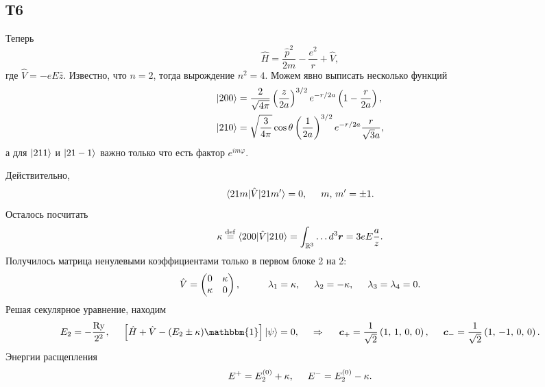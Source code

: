 \subsection*{Т6}


Теперь
\begin{equation*}
    \hat{H} = \frac{\hat{p}^2}{2m} - \frac{e^2}{r} + \hat{V},
\end{equation*}
где $\hat{V} = - e E \hat{z}$. Известно, что $n=2$, тогда вырождение $n^2 = 4$. Можем явно выписать несколько функций
\begin{align*}
    \left| 200 \right\rangle &= \frac{2}{\sqrt{4 \pi}} \left(\frac{z}{2a}\right)^{3/2} e^{-r/2a} \left(
        1 - \frac{r}{2a}
    \right), \\
    \left| 210 \right\rangle &= \sqrt{\frac{3}{4\pi}} \cos \theta \left(\frac{1}{2a}\right)^{3/2} e^{-r/2a} \frac{r}{\sqrt{3} a}, 
\end{align*}
а для $\left| 211 \right\rangle$ и $\left| 21-1 \right\rangle$ важно только что есть фактор $e^{im\varphi}$.

Действительно,
\begin{equation*}
    \bk{21m}[\hat{V}]{21m'} = 0,
    \hspace{5 mm} 
    m,\, m' = \pm 1.
\end{equation*}
Осталось посчитать
\begin{equation*}
    \kappa \overset{\mathrm{def}}{=}  \bk{200}[\hat{V}]{210} = \int_{\mathbb{R}^3}
        \ldots
    d^3 \vc{r} = 3 e E \frac{a}{z}.
\end{equation*}
Получилось матрица  ненулевыми коэффициентами только в первом блоке 2 на 2:
\begin{equation*}
    \hat{V} = \begin{pmatrix}
        0 & \kappa  \\
        \kappa & 0  \\
    \end{pmatrix},
    \hspace{10 mm} 
    \lambda_1 = \kappa, \hspace{5 mm} 
    \lambda_2 = - \kappa,
    \hspace{5 mm}   
    \lambda_3 =  \lambda_4 = 0.
\end{equation*}
Решая секулярное уравнение, находим
\begin{equation*}
    E_2 =  - \frac{\text{Ry}}{2^2},
    \hspace{5 mm} 
    \left[\hat{H} + \hat{V} - (E_2 \pm \kappa) \mathbbm{1}\right] \ket{\psi} = 0,
    \hspace{0.5cm} \Rightarrow \hspace{0.5cm}
    \vc{c}_+ = \frac{1}{\sqrt{2}} \left(1,\, 1,\, 0,\, 0\right),
    \hspace{5 mm} 
    \vc{c}_- = \frac{1}{\sqrt{2}} \left(1,\, -1,\, 0,\, 0\right).
\end{equation*}
Энергии расщепления
\begin{equation*}
    E^+ = E_2^{(0)} + \kappa,
    \hspace{5 mm} 
    E^- = E_{2}^{(0)} -\kappa.
\end{equation*}




